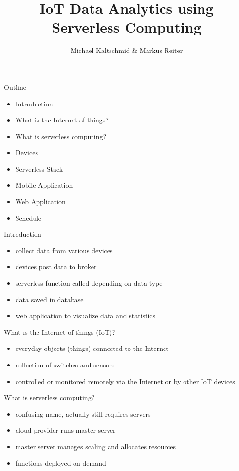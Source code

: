 \documentclass[aspectratio=1610]{beamer}
\title{IoT Data Analytics using Serverless Computing}
\author{Michael Kaltschmid \& Markus Reiter}
\date{}
\begin{document}
  \maketitle

  \begin{frame}{Outline}
    \begin{itemize}
      \item Introduction
      \item What is the Internet of things?
      \item What is serverless computing?
      \item Devices
      \item Serverless Stack
      \item Mobile Application
      \item Web Application
      \item Schedule
    \end{itemize}
  \end{frame}

  \begin{frame}{Introduction}
    \begin{itemize}
      \item collect data from various devices
      \item devices post data to broker
      \item serverless function called depending on data type
      \item data saved in database
      \item web application to visualize data and statistics
    \end{itemize}
  \end{frame}

  \begin{frame}{What is the Internet of things (IoT)?}
    \begin{itemize}
      \item everyday objects (things) connected to the Internet
      \item collection of switches and sensors
      \item controlled or monitored remotely via the Internet or by other IoT devices
    \end{itemize}
  \end{frame}

  \begin{frame}{What is serverless computing?}
    \begin{itemize}
      \item confusing name, actually still requires servers
      \item cloud provider runs master server
      \item master server manages scaling and allocates resources
      \item functions deployed on-demand
    \end{itemize}
  \end{frame}
\end{document}
